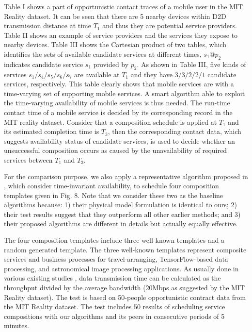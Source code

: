 \documentclass[journal]{IEEEtran}
\begin{document}
Table I shows a part of opportunistic contact traces of a mobile user in the MIT Reality dataset. It can be seen that there are 5 nearby devices within D2D transmission distance at time $T_1$ and thus they are potential service providers. Table II shows an example of service providers and the services they expose to nearby devices. Table III shows the Cartesian product of two tables, which identifies the sets of available candidate services at different times, $s_1$@$p_2$ indicates candidate service $s_1$ provided by $p_2$.
As shown in Table III, five kinds of services $s_1/s_4/s_5/s_6/s_7$ are available at $T_1$ and they have $3/3/2/2/1$ candidate services, respectively.
This table clearly shows that mobile services are with a time-varying set of supporting mobile services.
A smart algorithm able to exploit the time-varying availability of mobile services is thus needed. The run-time contact time of a mobile service is decided by its corresponding record in the MIT reality dataset. Consider that a composition schedule is applied at $T_1$ and its estimated completion time is $T_3$, then the corresponding contact data, which suggests availability status of candidate services, is used to decide whether an unsuccessful composition occurs as caused by the unavailability of required services between $T_1$ and $T_3$.

For the comparison purpose, we also apply a representative algorithm proposed in \cite{Deng2017} \cite{sadiq2015service}, which consider time-invariant availability, to schedule four composition templates given in Fig. 8. Note that we consider these two as the baseline algorithms because: 1) their physical model formulation is identical to ours; 2) their test results suggest that they outperform all other earlier methods; and 3) their proposed algorithms are different in details but actually equally effective.

The four composition templates include three well-known templates and a random generated template. The three well-known templates represent composite services and business processes for travel-arranging, TensorFlow-based data processing, and astronomical image processing applications. As usually done in various existing studies \cite{Meena2016Cost, Rodriguez2014Deadline}, data transmission time can be calculated as the throughput divided by the average bandwidth (20Mbps as suggested by the MIT Reality dataset). 
The test is based on 50-people opportunistic contract data from the MIT Reality dataset. The test includes 50 results of scheduling service compositions with our algorithms and its peers in consecutive periods of 5 minutes. 
\end{document}
